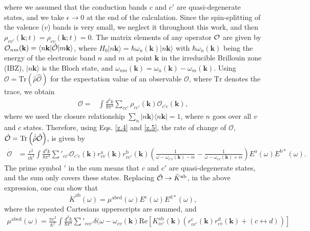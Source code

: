 \documentclass[floatfix,prb,aps,superscriptaddress,showpacs,11pt,preprint,letterpaper]{revtex4}
\begin{document}
where we assumed that the conduction bands $c$ and $c'$ are quasi-degenerate
states, and we take $\epsilon\to 0$ at the end of the calculation. 
Since the 
spin-splitting of the valence ($v$) bands is very small, we neglect it throughout
this work,\cite{nastosPRB07} and then
$\rho_{vv'}({\mathbf k};t)= 
\rho_{cv}({\mathbf k};t) =0$. 
 The matrix elements of any operator ${\cal O}$ are
given by ${\cal O}_{nm}({\mathbf k})=\langle n{\mathbf k}|\hat{\cal O}|
m{\mathbf k}\rangle$, where $H_{0}|n{\mathbf k}\rangle = \hbar
\omega_{n}({\mathbf k})|n{\mathbf k}\rangle$ with $\hbar \omega_{n}({\mathbf
k})$ being the energy of the electronic band $n$ and $m$ at point ${\mathbf k}$ in the
irreducible Brillouin zone (IBZ),  $|n{\mathbf k}\rangle$ is the Bloch state,
and $\omega_{nm}({\mathbf k})=\omega_{n}({\mathbf k})-\omega_{m}({\mathbf k})$.
Using $\mathcal{O} = \mathrm{Tr}(\hat{\rho}\hat{\mathcal{O}})$ for the
expectation value of an observable $\mathcal{O}$, where $\mathrm{Tr}$ denotes
the trace, we obtain
\begin{align}\label{z.5}
\mathcal{O} = & 
\int \frac{d^{3}k}{8\pi^{3}} \sum_{cc'} \rho_{cc'}({\mathbf k}) 
\mathcal{O}_{c'c}({\mathbf k}),
\end{align}
where we used the closure relationship $\sum_{n}|n{\mathbf k}\rangle \langle
n{\mathbf k}| = 1$, where $n$ goes over all $v$ and $c$ states.
Therefore, using  Eqs. \eqref{z.4}
and \eqref{z.5}, the rate of change of $\mathcal{O}$, $\dot{\mathcal{O}} =
\mathrm{Tr} \left( \dot{\hat\rho} \hat{\cal O} \right)$, is given by
\begin{align}
\dot{\mathcal{O}} 
&=\frac{e^{2}}{i\hbar^{2}} \int \frac{d^{3}k}{8\pi^{3}} 
\sum'_{cc'} \mathcal{O}_{c'c}({\mathbf k}) 
r^{\mathrm{a}}_{cv}({\mathbf k})  r^{\mathrm{b}}_{vc'}({\mathbf k})  
\left( \frac{1}{\omega - \omega_{c'v}({\mathbf k})  - i\epsilon} - 
\frac{1}{\omega - \omega_{cv}({\mathbf k})  + i\epsilon} \right)
E^{\mathrm{a}}(\omega) E^{\mathrm{b*}}(\omega)
\label{eq:dotO}
.
\end{align}
The prime symbol $'$ in the sum means that $c$ and $c'$ are quasi-degenerate
states, and the sum only covers these states. Replacing  $\hat{\cal O}
\rightarrow \hat{K}^{\mathrm{ab}}$, in the above expression, one can show that
\begin{equation}
\dot{K}^{\mathrm{ab}}(\omega) =
\mu^{\mathrm{abcd}}(\omega)
E^{\mathrm{c}}(\omega) E^{\mathrm{d*}}(\omega),
\label{eq:dotk}
\end{equation}
where the repeated Cartesians upperscripts  are summed, and 
\begin{equation}\label{eq:mu}
\begin{aligned}
\mu^{\mathrm{abcd}}  (\omega) 
=
\frac{\pi e^{2}}{\hbar^{2}} \int 
\frac{d^{3}k}{8 \pi^{3}} \sum'_{vcc'}
\delta(\omega-\omega_{cv}({\mathbf k}) 
\mathrm{Re} \left[ K^{\mathrm{ab}}_{cc'}({\mathbf k}) 
\left(  
r^{\mathrm{c}}_{vc'}({\mathbf k})   
r^{\mathrm{d}}_{cv }({\mathbf k})  +
(c \leftrightarrow d)  
\right) 
\right]
\end{aligned}
\end{equation} 
\end{document}
